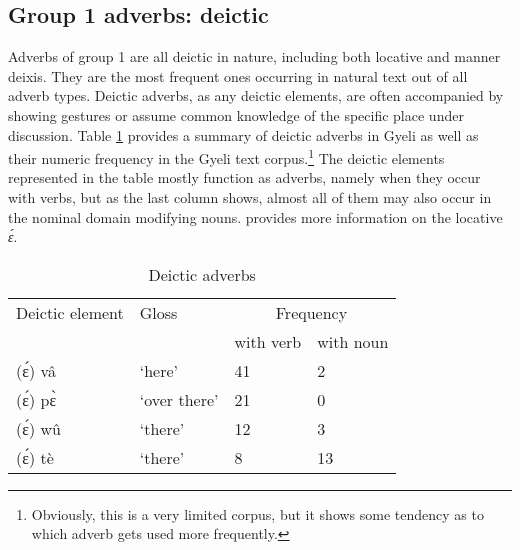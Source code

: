 

\subsection{Group 1 adverbs: deictic} 
\label{sec:G1ADV}

Adverbs of group 1 are all deictic in nature, including both locative and manner deixis. They are the most frequent ones occurring in natural text out of all adverb types. 
Deictic adverbs, as any deictic elements, are often accompanied by showing gestures or assume  common knowledge of the specific place under discussion. Table \ref{Tab:DeicAdv} provides a summary of deictic adverbs in Gyeli as well as their numeric frequency in the Gyeli text corpus.\footnote{Obviously, this is a very limited corpus, but it shows some tendency as to which adverb gets used more frequently.} The deictic elements represented in the table mostly function as adverbs, namely when they occur with verbs, but as the last column shows, almost all of them may also occur in the nominal domain modifying nouns.   provides more information on the locative {\itshape ɛ́}.

\begin{table} 
\centering
\begin{tabular}{llll}
Deictic element & Gloss & \multicolumn{2}{c}{Frequency} \\ 
                        &            &        with verb  & with noun \\  \midrule
(ɛ́) vâ & `here' & 41 & 2 \\
(ɛ́) pɛ̀ & `over there' & 21 & 0 \\
(ɛ́) wû & `there' & 12 & 3 \\ 
(ɛ́) tè & `there' & 8 & 13 \\
\end{tabular}
\caption{Deictic adverbs}
\label{Tab:DeicAdv}
\end{table} 



